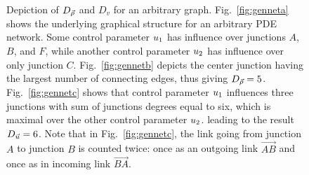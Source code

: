 \begin{figure}
\begin{centering}
\par\end{centering}

\caption[Depiction of $D_{\state}$ and $D_{v}$ for an arbitrary graph.]{Depiction of $D_{\state}$ and $D_{v}$ for an arbitrary graph. Fig.~\ref{fig:genneta}
shows the underlying graphical structure for an arbitrary PDE network.
Some control parameter $u_{1}$ has influence over junctions
$A$, $B$, and $F$, while another control parameter $u_{2}$
has influence over only junction $C$. Fig.~\ref{fig:gennetb}
depicts the center junction having the largest number of connecting
edges, thus giving $D_{\vec{\rho}}=5$. Fig.~\ref{fig:gennetc} shows
that control parameter $u_{1}$ influences three junctions with
sum of junctions degrees equal to six, which is maximal over the other
control parameter $u_{2}$. leading to the result $D_{\vec{u}}=6$.
Note that in Fig.~\ref{fig:gennetc}, the link going from junction
$A$ to junction $B$ is counted twice: once as an outgoing link $\vec{AB}$
and once as in incoming link $\vec{BA}$.\label{fig:Depicting--and}}
\end{figure}

